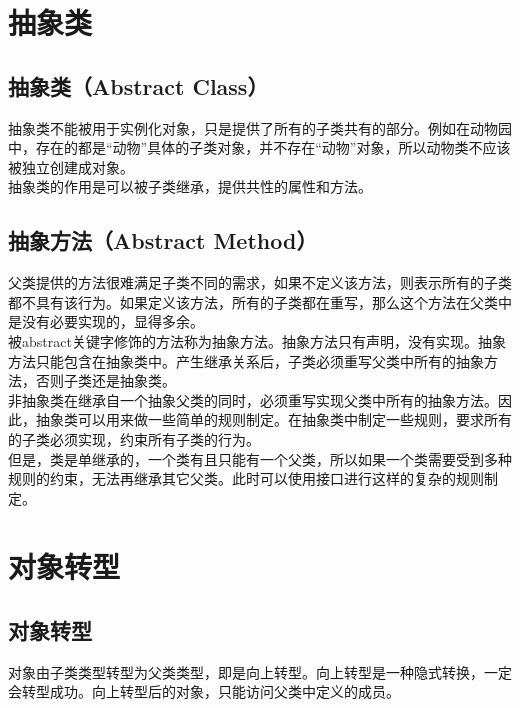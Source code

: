\newpage

\section{抽象类}

\subsection{抽象类（Abstract Class）}

抽象类不能被用于实例化对象，只是提供了所有的子类共有的部分。例如在动物园中，存在的都是“动物”具体的子类对象，并不存在“动物”对象，所以动物类不应该被独立创建成对象。 \\

抽象类的作用是可以被子类继承，提供共性的属性和方法。

\subsection{抽象方法（Abstract Method）}

父类提供的方法很难满足子类不同的需求，如果不定义该方法，则表示所有的子类都不具有该行为。如果定义该方法，所有的子类都在重写，那么这个方法在父类中是没有必要实现的，显得多余。 \\

被abstract关键字修饰的方法称为抽象方法。抽象方法只有声明，没有实现。抽象方法只能包含在抽象类中。产生继承关系后，子类必须重写父类中所有的抽象方法，否则子类还是抽象类。 \\

非抽象类在继承自一个抽象父类的同时，必须重写实现父类中所有的抽象方法。因此，抽象类可以用来做一些简单的规则制定。在抽象类中制定一些规则，要求所有的子类必须实现，约束所有子类的行为。 \\

但是，类是单继承的，一个类有且只能有一个父类，所以如果一个类需要受到多种规则的约束，无法再继承其它父类。此时可以使用接口进行这样的复杂的规则制定。

\newpage

\section{对象转型}

\subsection{对象转型}

对象由子类类型转型为父类类型，即是向上转型。向上转型是一种隐式转换，一定会转型成功。向上转型后的对象，只能访问父类中定义的成员。 \\

